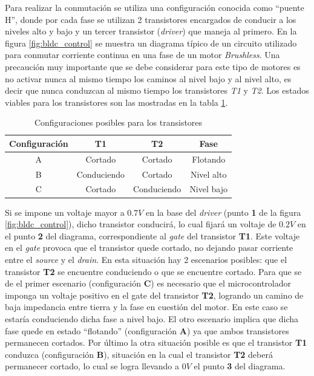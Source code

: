 \documentclass[main]{subfiles}
\begin{document}
Para realizar la conmutación se utiliza una configuración conocida como ``puente H'', donde por cada fase se utilizan 2 transistores encargados de conducir a los niveles alto y bajo y un tercer transistor (\emph{driver}) que maneja al primero. En la figura \ref{fig:bldc_control} se muestra un diagrama típico de un circuito utilizado para conmutar corriente continua en una fase de un motor \emph{Brushless}. Una precaución muy importante que se debe considerar para este tipo de motores es no activar nunca al mismo tiempo los caminos al nivel bajo y al nivel alto, es decir que nunca conduzcan al mismo tiempo los transistores \emph{T1} y \emph{T2}. Los estados viables para los transistores son las mostradas en la tabla \ref{tab:estado_transistores}.\\

\begin{table}[H]
\begin{center}
\vspace{-10pt}
\begin{tabular}{|c|c|c|c|}
\hline
\textbf{Configuración} & \textbf{T1} & \textbf{T2} & \textbf{Fase} \\ \hline
A & Cortado & Cortado & Flotando \\
B & Conduciendo & Cortado & Nivel alto \\
C & Cortado & Conduciendo & Nivel bajo \\
\hline
\end{tabular}
\caption{Configuraciones posibles para los transistores}
\vspace{-20pt}
\label{tab:estado_transistores}
\end{center}
\end{table}

Si se impone un voltaje mayor a $0.7 V$ en la base del \emph{driver} (punto \textbf{1} de la figura \ref{fig:bldc_control}), dicho transistor conducirá, lo cual fijará un voltaje de $0.2V$ en el punto \textbf{2} del diagrama, correspondiente al \emph{gate} del transistor \textbf{T1}. Este voltaje en el \emph{gate} provoca que el transistor quede cortado, no dejando pasar corriente entre el \emph{source} y el \emph{drain}. En esta situación hay 2 escenarios posibles: que el transistor \textbf{T2} se encuentre conduciendo o que se encuentre cortado. Para que se de el primer escenario (configuración \textbf{C}) es necesario que el microcontrolador imponga un voltaje positivo en el gate del transistor \textbf{T2}, logrando un camino de baja impedancia entre tierra y la fase en cuestión del motor. En este caso se estaría conduciendo dicha fase a nivel bajo. El otro escenario implica que dicha fase quede en estado ``flotando'' (configuración \textbf{A}) ya que ambos transistores permanecen cortados. Por último la otra situación posible es que el transistor \textbf{T1} conduzca (configuración \textbf{B}), situación en la cual el transistor \textbf{T2} deberá permanecer cortado, lo cual se logra llevando a $0V$ el punto \textbf{3} del diagrama.\\
\end{document}
